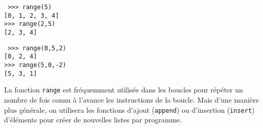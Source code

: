 \noindent\mbox{}\hspace*{1cm}\begin{py}{6.5cm}\tt
>>> range(5)\\
\mbox{}[0, 1, 2, 3, 4]\\
>>> range(2,5)\\
\mbox{}[2, 3, 4]
\end{py}
\hfill
\begin{py}{6.5cm}\tt
>>> range(0,5,2)\\
\mbox{}[0, 2, 4]\\
>>> range(5,0,-2)\\
\mbox{}[5, 3, 1]
\end{py}
\vspace*{2mm}

\noindent La fonction {\tt range} est fréquemment utilisée dans les boucles pour répéter 
un nombre de fois connu à l'avance les instructions de la boucle. Mais d'une manière 
plus générale, on utilisera les fonctions d'ajout ({\tt append}) ou d'insertion
({\tt insert}) d'éléments pour créer de nouvelles listes par programme.

